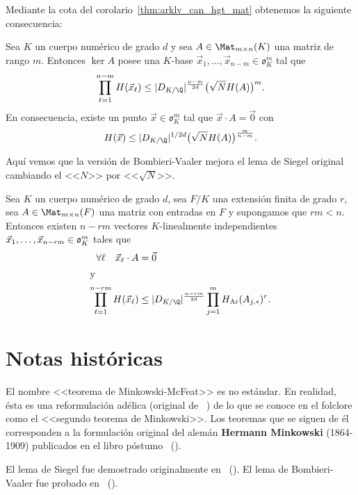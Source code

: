 \documentclass[teoria-numeros.tex]{subfiles}
\begin{document}
Mediante la cota del corolario~\ref{thm:arklv_can_hgt_mat} obtenemos la siguiente consecuencia:
\begin{cor}
	Sea $K$ un cuerpo numérico de grado $d$ y sea $A \in \Mat_{m\times n}(K)$ una matriz de rango $m$.
	Entonces $\ker A$ posee una $K$-base $\vec x_1, \dots, \vec x_{n-m} \in \mathfrak{o}_K^m$ tal que
	$$ \prod_{\ell=1}^{n-m} H(\vec x_\ell) \le |D_{K/\Q}|^{ \frac{n-m}{2d} } \big( \sqrt{N}H(A) \big)^m. $$
	En consecuencia, existe un punto $\vec x \in \mathfrak{o}_K^m$ tal que $\vec x\cdot A = \Vec 0$ con
	$$ H(\vec x) \le |D_{K/\Q}|^{1/2d} \big( \sqrt{N}H(A) \big)^{ \frac{m}{n-m} }. $$
\end{cor}
Aquí vemos que la versión de Bombieri-Vaaler mejora el lema de Siegel original cambiando el <<$N$>> por <<$\sqrt{N}$>>.

\begin{thmi}
	Sea $K$ un cuerpo numérico de grado $d$, sea $F/K$ una extensión finita de grado $r$, sea $A \in \Mat_{m\times n}(F)$ una matriz con entradas en $F$
	y supongamos que $rm < n$.
	Entonces existen $n - rm$ vectores $K$-linealmente independientes $\vec x_1, \dots, \break \vec x_{n-rm} \in \mathfrak{o}_K^m$ tales que
	\begin{align*}
		\forall \ell \quad \vec x_\ell\cdot A &= \Vec 0 \\
		\intertext{y}
		\prod_{\ell=1}^{n-rm} H(\vec x_\ell) &\le |D_{K/\Q}|^{ \frac{n-rm}{2d} } \prod_{j=1}^{m} H_\Ar(A_{j,*})^r.
	\end{align*}
\end{thmi}

\section*{Notas históricas}
El nombre <<teorema de Minkowski-McFeat>> es no estándar.
En realidad, ésta es una reformulación adélica (original de \citeauthor{mcfeat:geometry}~\cite{mcfeat:geometry})
de lo que se conoce en el folclore como el <<segundo teorema de Minkowski>>.
Los teoremas que se siguen de él corresponden a la formulación original del alemán \textbf{Hermann Minkowski} (1864-1909)
publicados en el libro póstumo \cite{minkowski1896geometrie}~(\citeyear{minkowski1896geometrie}).

El lema de Siegel fue demostrado originalmente en \cite{siegel29diophantischer}~(\citeyear{siegel29diophantischer}).
El lema de Bombieri-Vaaler fue probado en \cite{bombieri83siegel}~(\citeyear{bombieri83siegel}).
\end{document}
